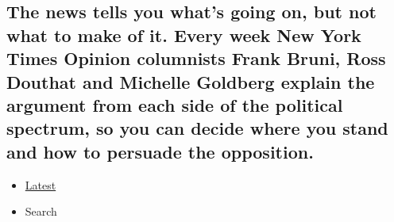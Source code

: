 \hypertarget{the-news-tells-you-whats-going-on-but-not-what-to-make-of-it-every-week-new-york-times-opinion-columnists-frank-bruni-ross-douthat-and-michelle-goldberg-explain-the-argument-from-each-side-of-the-political-spectrum-so-you-can-decide-where-you-stand-and-how-to-persuade-the-opposition-1}{%
\subsection{The news tells you what's going on, but not what to make of
it. Every week New York Times Opinion columnists Frank Bruni, Ross
Douthat and Michelle Goldberg explain the argument from each side of the
political spectrum, so you can decide where you stand and how to
persuade the
opposition.}\label{the-news-tells-you-whats-going-on-but-not-what-to-make-of-it-every-week-new-york-times-opinion-columnists-frank-bruni-ross-douthat-and-michelle-goldberg-explain-the-argument-from-each-side-of-the-political-spectrum-so-you-can-decide-where-you-stand-and-how-to-persuade-the-opposition-1}}

\begin{itemize}
\tightlist
\item
  \protect\hyperlink{stream-panel}{Latest}
\item
  Search
\end{itemize}

